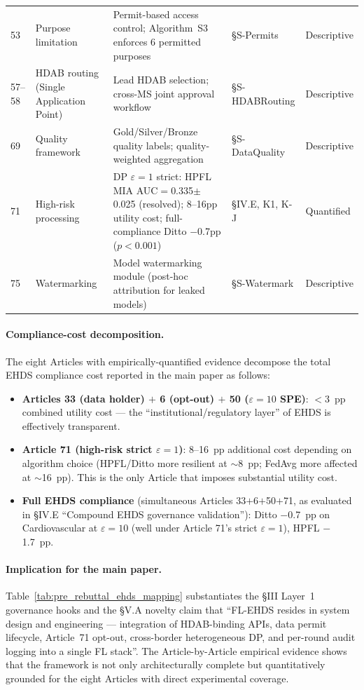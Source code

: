 \documentclass[conference]{IEEEtran}
\begin{document}
\begin{table}[htbp]
{\begin{tabular}{p{0.7cm}p{2.7cm}p{6.6cm}p{1.7cm}p{1.5cm}}
53 & Purpose limitation & Permit-based access control; Algorithm~S3 enforces 6 permitted purposes & §S-Permits & Descriptive \\
57--58 & HDAB routing (Single Application Point) & Lead HDAB selection; cross-MS joint approval workflow & §S-HDABRouting & Descriptive \\
69 & Quality framework & Gold/Silver/Bronze quality labels; quality-weighted aggregation & §S-DataQuality & Descriptive \\
71 & High-risk processing & DP $\varepsilon{=}1$ strict: HPFL MIA AUC$=$0.335$\pm$0.025 (resolved); 8--16pp utility cost; full-compliance Ditto $-$0.7pp ($p{<}0.001$) & §IV.E, K1, K-J & Quantified \\
75 & Watermarking & Model watermarking module (post-hoc attribution for leaked models) & §S-Watermark & Descriptive \\
\bottomrule
\end{tabular}%
}
\end{table}

\paragraph{Compliance-cost decomposition.} The eight Articles with empirically-quantified evidence decompose the total EHDS compliance cost reported in the main paper as follows:

\begin{itemize}
\item \textbf{Articles 33 (data holder) $+$ 6 (opt-out) $+$ 50 ($\varepsilon{=}10$ SPE)}: $<$3~pp combined utility cost --- the ``institutional/regulatory layer'' of EHDS is effectively transparent.
\item \textbf{Article 71 (high-risk strict $\varepsilon{=}1$)}: 8--16~pp additional cost depending on algorithm choice (HPFL/Ditto more resilient at $\sim$8~pp; FedAvg more affected at $\sim$16~pp). This is the only Article that imposes substantial utility cost.
\item \textbf{Full EHDS compliance} (simultaneous Articles 33$+$6$+$50$+$71, as evaluated in §IV.E ``Compound EHDS governance validation''): Ditto $-$0.7~pp on Cardiovascular at $\varepsilon{=}10$ (well under Article 71's strict $\varepsilon{=}1$), HPFL $-$1.7~pp.
\end{itemize}

\paragraph{Implication for the main paper.} Table~\ref{tab:pre_rebuttal_ehds_mapping} substantiates the §III Layer~1 governance hooks and the §V.A novelty claim that ``FL-EHDS resides in system design and engineering --- integration of HDAB-binding APIs, data permit lifecycle, Article~71 opt-out, cross-border heterogeneous DP, and per-round audit logging into a single FL stack''. The Article-by-Article empirical evidence shows that the framework is not only architecturally complete but quantitatively grounded for the eight Articles with direct experimental coverage.
\end{document}
